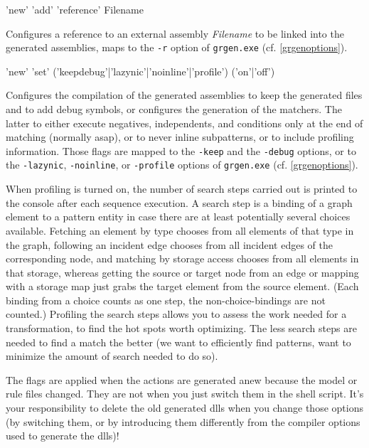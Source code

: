 \begin{rail}
  'new' 'add' 'reference' Filename
\end{rail}
Configures a reference to an external assembly \emph{Filename} to be linked into the generated assemblies, maps to the \texttt{-r} option of \texttt{grgen.exe} (cf. \ref{grgenoptions}).

\begin{rail}
  'new' 'set' ('keepdebug'|'lazynic'|'noinline'|'profile') ('on'|'off')
\end{rail}
Configures the compilation of the generated assemblies to keep the generated files and to add debug symbols,
or configures the generation of the matchers.
The latter to either execute negatives, independents, and conditions only at the end of matching (normally asap),
or to never inline subpatterns,
or to include profiling information.
Those flags are mapped to the \texttt{-keep} and the \texttt{-debug} options, or to the \texttt{-lazynic}, \texttt{-noinline}, or  \texttt{-profile} options of \texttt{grgen.exe} (cf. \ref{grgenoptions}).

When profiling is turned on, the number of search steps carried out is printed to the console after each sequence execution.
A search step is a binding of a graph element to a pattern entity in case there are at least potentially several choices available.
Fetching an element by type chooses from all elements of that type in the graph, following an incident edge chooses from all incident edges of the corresponding node, and matching by storage access chooses from all elements in that storage, whereas getting the source or target node from an edge or mapping with a storage map just grabs the target element from the source element.
(Each binding from a choice counts as one step, the non-choice-bindings are not counted.)
Profiling the search steps allows you to assess the work needed for a transformation, to find the hot spots worth optimizing.
The less search steps are needed to find a match the better (we want to efficiently find patterns, want to minimize the amount of search needed to do so). 

The flags are applied when the actions are generated anew because the model or rule files changed. They are not when you just switch them in the shell script. It's your responsibility to delete the old generated dlls when you change those options (by switching them, or by introducing them differently from the compiler options used to generate the dlls)!

